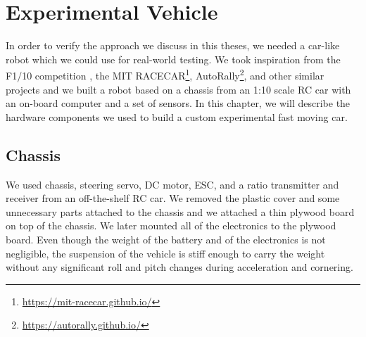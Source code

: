 \chapter{Experimental Vehicle}

\label{chapter:hardware}

In order to verify the approach we discuss in this theses, we needed a car-like robot which we could use for real-world testing. We took inspiration from the F1/10 competition \cite{F1/10}, the MIT RACECAR\footnote{\url{https://mit-racecar.github.io/}}, AutoRally\footnote{\url{https://autorally.github.io/}}, and other similar projects and we built a robot based on a chassis from an 1:10 scale \gls{RC} car with an on-board computer and a set of sensors. In this chapter, we will describe the hardware components we used to build a custom experimental fast moving car.

\section{Chassis}

We used chassis, steering servo, \gls{DC} motor, \gls{ESC}, and a ratio transmitter and receiver from an off-the-shelf \gls*{RC} car. We removed the plastic cover and some unnecessary parts attached to the chassis and we attached a thin plywood board on top of the chassis. We later mounted all of the electronics to the plywood board. Even though the weight of the battery and of the electronics is not negligible, the suspension of the vehicle is stiff enough to carry the weight without any significant roll and pitch changes during acceleration and cornering.

